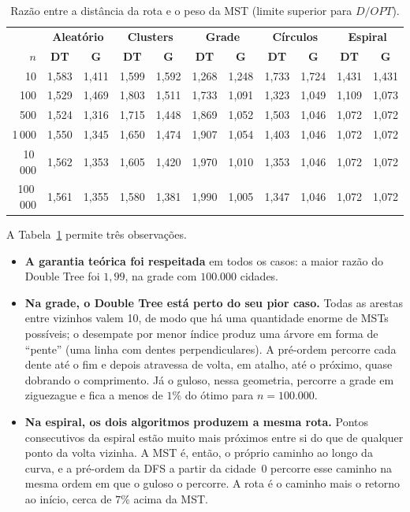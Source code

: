 \documentclass[11pt,a4paper]{article}
\newcommand{\cab}[1]{\leavevmode\color{white}\bfseries #1}
\newcommand{\fioCabecalho}{\arrayrulecolor{tabFio}\specialrule{1.2pt}{0pt}{0pt}\arrayrulecolor{eachTeal}}
\renewcommand{\_}{\underscoreoriginal\allowbreak}
\begin{document}
\begin{table}[H]
\centering
\caption{Razão entre a distância da rota e o peso da MST (limite superior para $D/OPT$).}
\label{tab:razoes}
\small
\setlength{\tabcolsep}{4.2pt}
\begin{tabular}{r cc cc cc cc cc}
\toprule
\rowcolor{tabCabecalho}
 & \multicolumn{2}{c}{\cab{Aleatório}} & \multicolumn{2}{c}{\cab{Clusters}} & \multicolumn{2}{c}{\cab{Grade}} & \multicolumn{2}{c}{\cab{Círculos}} & \multicolumn{2}{c}{\cab{Espiral}}\\
\rowcolor{tabCabecalho}
\cab{$n$} & \cab{DT} & \cab{G} & \cab{DT} & \cab{G} & \cab{DT} & \cab{G} & \cab{DT} & \cab{G} & \cab{DT} & \cab{G}\\
\fioCabecalho
10 & 1{,}583 & 1{,}411 & 1{,}599 & 1{,}592 & 1{,}268 & 1{,}248 & 1{,}733 & 1{,}724 & 1{,}431 & 1{,}431 \\
100 & 1{,}529 & 1{,}469 & 1{,}803 & 1{,}511 & 1{,}733 & 1{,}091 & 1{,}323 & 1{,}049 & 1{,}109 & 1{,}073 \\
500 & 1{,}524 & 1{,}316 & 1{,}715 & 1{,}448 & 1{,}869 & 1{,}052 & 1{,}503 & 1{,}046 & 1{,}072 & 1{,}072 \\
1\,000 & 1{,}550 & 1{,}345 & 1{,}650 & 1{,}474 & 1{,}907 & 1{,}054 & 1{,}403 & 1{,}046 & 1{,}072 & 1{,}072 \\
10\,000 & 1{,}562 & 1{,}353 & 1{,}605 & 1{,}420 & 1{,}970 & 1{,}010 & 1{,}353 & 1{,}046 & 1{,}072 & 1{,}072 \\
100\,000 & 1{,}561 & 1{,}355 & 1{,}580 & 1{,}381 & 1{,}990 & 1{,}005 & 1{,}347 & 1{,}046 & 1{,}072 & 1{,}072 \\
\bottomrule
\end{tabular}
\end{table}

A Tabela~\ref{tab:razoes} permite três observações.

\begin{itemize}
  \item \textbf{A garantia teórica foi respeitada} em todos os casos:
    a maior razão do Double Tree foi $1{,}99$, na grade com $100.000$
    cidades.
  \item \textbf{Na grade, o Double Tree está perto do seu pior caso.}
    Todas as arestas entre vizinhos valem 10, de modo que há uma
    quantidade enorme de MSTs possíveis; o desempate por menor índice
    produz uma árvore em forma de ``pente'' (uma linha com dentes
    perpendiculares). A pré-ordem percorre cada dente até o fim e
    depois atravessa de volta, em atalho, até o próximo, quase dobrando
    o comprimento. Já o guloso, nessa geometria, percorre a grade em
    ziguezague e fica a menos de $1\%$ do ótimo para $n=100.000$.
  \item \textbf{Na espiral, os dois algoritmos produzem a mesma rota.}
    Pontos consecutivos da espiral estão muito mais próximos entre si
    do que de qualquer ponto da volta vizinha. A MST é, então, o
    próprio caminho ao longo da curva, e a pré-ordem da DFS a partir da
    cidade~0 percorre esse caminho na mesma ordem em que o guloso o
    percorre. A rota é o caminho mais o retorno ao início, cerca de
    $7\%$ acima da MST.
\end{itemize}
\end{document}
